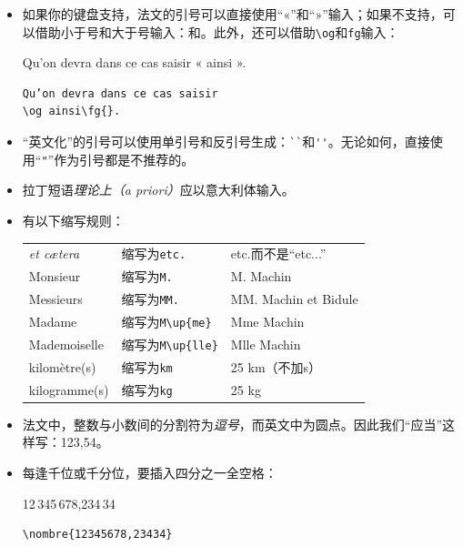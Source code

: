 \begin{itemize}
    \item 如果你的键盘支持，法文的引号可以直接使用“«”和“»”输入；如果不支持，可以借助小于号和大于号输入：\dm{<<}和\dm{>>}。此外，还可以借助\verb|\og|和\verb|fg|输入：
    
    \begin{codelist}[7.3]{
        Qu’on devra dans ce cas saisir « ainsi ».
    }\begin{verbatim}
Qu’on devra dans ce cas saisir
\og ainsi\fg{}.
    \end{verbatim}
    \end{codelist}

    \item “英文化”的引号可以使用单引号和反引号生成：\verb|``|和\verb|''|。无论如何，直接使用“\verb|"|”作为引号都是不推荐的。
    
    \item 拉丁短语\emph{理论上（a priori）}应以意大利体输入。
    
    \item 有以下缩写规则：

    \begin{center}
        \begin{tabular}{|l|l|l|}
            \hline
            \emph{et cætera} & 缩写为\quad \verb|etc.| & etc.而不是“etc...” \\
            Monsieur & 缩写为\quad \verb|M.| & M. Machin \\
            Messieurs & 缩写为\quad \verb|MM.| & MM. Machin et Bidule\\
            Madame & 缩写为\quad \verb|M\up{me}| & Mme Machin\\
            Mademoiselle & 缩写为\quad \verb|M\up{lle}| & Mlle Machin\\
            kilomètre(s) & 缩写为\quad \verb|km| & 25 km（不加s）\\
            kilogramme(s) & 缩写为\quad \verb|kg| & 25 kg\\
            \hline
        \end{tabular}
    \end{center}

    \item 法文中，整数与小数间的分割符为\emph{逗号}，而英文中为圆点。因此我们“应当”这样写：123,54。
    
    \item 每逢千位或千分位，要插入四分之一全空格：
    \begin{codelist}[7.4]{
        12\,345\,678,234\,34
    }\begin{verbatim}
\nombre{12345678,23434}
    \end{verbatim}
    \end{codelist}


\end{itemize}

